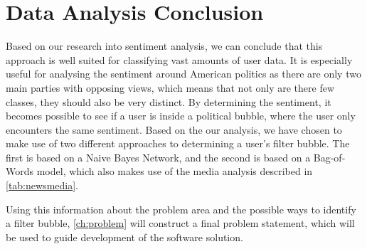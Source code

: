 \section{Data Analysis Conclusion}\label{sec:DAConc}
Based on our research into sentiment analysis, we can conclude that this
approach is well suited for classifying vast amounts of user data. It is
especially useful for analysing the sentiment around American politics as there
are only two main parties with opposing views, which means that not only are
there few classes, they should also be very distinct. By determining the
sentiment, it becomes possible to see if a user is inside a political bubble,
where the user only encounters the same sentiment. Based on the our analysis, we
have chosen to make use of two different approaches to determining a user's
filter bubble. The first is based on a Naive Bayes Network, and the second is
based on a Bag-of-Words model, which also makes use of the media analysis
described in \autoref{tab:newsmedia}.

Using this information about the problem area and the possible ways to identify
a filter bubble, \autoref{ch:problem} will construct a final problem statement,
which will be used to guide development of the software solution.

